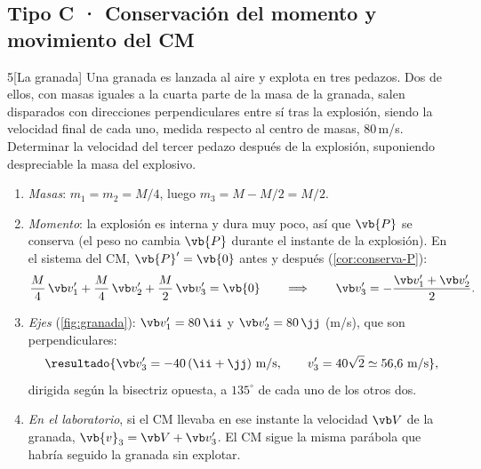 \subsection{Tipo C · Conservación del momento y movimiento del CM}

\begin{problema}{5}[La granada]
\label{prob:5}
Una granada es lanzada al aire y explota en tres pedazos. Dos de ellos, con
masas iguales a la cuarta parte de la masa de la granada, salen disparados
con direcciones perpendiculares entre sí tras la explosión, siendo la
velocidad final de cada uno, medida respecto al centro de masas, $80$\,m/s.
Determinar la velocidad del tercer pedazo después de la explosión, suponiendo
despreciable la masa del explosivo.
\end{problema}

\begin{resolucion}
\begin{enumerate}
  \item \emph{Masas}: $m_{1}=m_{2}=M/4$, luego $m_{3}=M-M/2=M/2$.
  \item \emph{Momento}: la explosión es interna y dura muy poco, así que $\vb{P}$
  se conserva (el peso no cambia $\vb{P}$ durante el instante de la explosión).
  En el sistema del CM, $\vb{P}'=\vb{0}$ antes y después (\cref{cor:conserva-P}):
  \[
    \frac M4\,\vp_{1}+\frac M4\,\vp_{2}+\frac M2\,\vp_{3}=\vb{0}
    \qquad\Longrightarrow\qquad
    \vp_{3}=-\frac{\vp_{1}+\vp_{2}}{2}.
  \]
  \item \emph{Ejes} (\cref{fig:granada}): $\vp_{1}=80\,\ii$ y $\vp_{2}=80\,\jj$ (m/s), que son
  perpendiculares:
  \[
    \resultado{\vp_{3}=-40\,(\ii+\jj)\ \text{m/s},\qquad
    v'_{3}=40\sqrt2\simeq56{,}6\ \text{m/s}} ,
  \]
  dirigida según la bisectriz opuesta, a $135^{\circ}$ de cada uno de los otros dos.
  \item \emph{En el laboratorio}, si el CM llevaba en ese instante la
  velocidad $\Vc$ de la granada, $\vb{v}_{3}=\Vc+\vp_{3}$. El CM sigue la misma
  parábola que habría seguido la granada sin explotar.\qedhere
\end{enumerate}
\end{resolucion}

